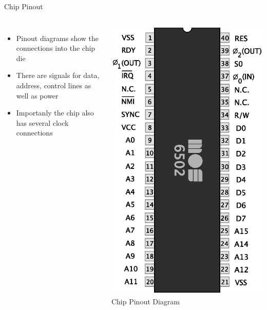 \documentclass{beamer}
\begin{document}
\begin{frame}{Chip Pinout}
  \begin{columns}
    \begin{itemize}
    \item
      Pinout diagrams show the connections into the chip die
    \item
      There are signals for data, address, control lines as well as power
    \item
      Importanly the chip also has several clock connections
    \end{itemize}

    \begin{center}
      \includegraphics[scale=0.25]{../assets/MOS6502.eps}
      \cite{MOS6502Chip} Chip Pinout Diagram
    \end{center}
    
  \end{columns}
\end{frame}
\end{document}
